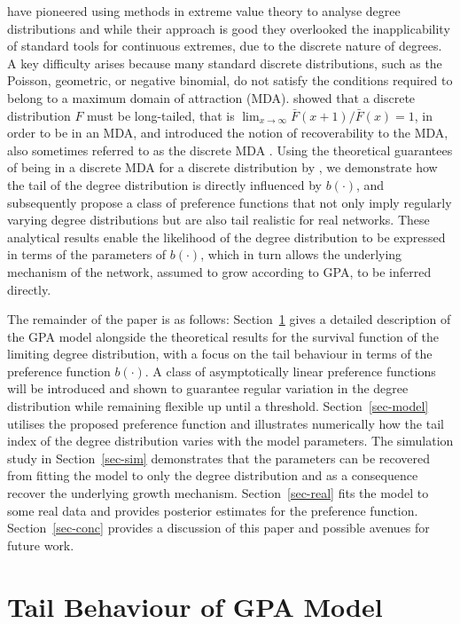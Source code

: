 \documentclass[
  sn-basic,
  10pt,
]{sn-jnl}
\theoremstyle{thmstyleone}
\theoremstyle{thmstyleone}
\theoremstyle{remark}
\theoremstyle{plain}
\theoremstyle{plain}
\theoremstyle{remark}
\begin{document}
\citet{Voitalov_2019} have pioneered using methods in extreme value
theory to analyse degree distributions and while their approach is good
they overlooked the inapplicability of standard tools for continuous
extremes, due to the discrete nature of degrees. A key difficulty arises
because many standard discrete distributions, such as the Poisson,
geometric, or negative binomial, do not satisfy the conditions required
to belong to a maximum domain of attraction (MDA). \citet{shimura12}
showed that a discrete distribution \(F\) must be long-tailed, that is
\(\lim_{x\rightarrow\infty}\bar F(x+1)/\bar F(x) = 1\), in order to be
in an MDA, and introduced the notion of recoverability to the MDA, also
sometimes referred to as the discrete MDA \citep{hitz24}. Using the
theoretical guarantees of being in a discrete MDA for a discrete
distribution by \citet{shimura12}, we demonstrate how the tail of the
degree distribution is directly influenced by \(b(\cdot)\), and
subsequently propose a class of preference functions that not only imply
regularly varying degree distributions but are also tail realistic for
real networks. These analytical results enable the likelihood of the
degree distribution to be expressed in terms of the parameters of
\(b(\cdot)\), which in turn allows the underlying mechanism of the
network, assumed to grow according to GPA, to be inferred directly.

The remainder of the paper is as follows: Section~\ref{sec-tail} gives a
detailed description of the GPA model alongside the theoretical results
for the survival function of the limiting degree distribution, with a
focus on the tail behaviour in terms of the preference function
\(b(\cdot)\). A class of asymptotically linear preference functions will
be introduced and shown to guarantee regular variation in the degree
distribution while remaining flexible up until a threshold.
Section~\ref{sec-model} utilises the proposed preference function and
illustrates numerically how the tail index of the degree distribution
varies with the model parameters. The simulation study in
Section~\ref{sec-sim} demonstrates that the parameters can be recovered
from fitting the model to only the degree distribution and as a
consequence recover the underlying growth mechanism.
Section~\ref{sec-real} fits the model to some real data and provides
posterior estimates for the preference function. Section~\ref{sec-conc}
provides a discussion of this paper and possible avenues for future
work.

\section{Tail Behaviour of GPA Model}\label{sec-tail}
\end{document}
